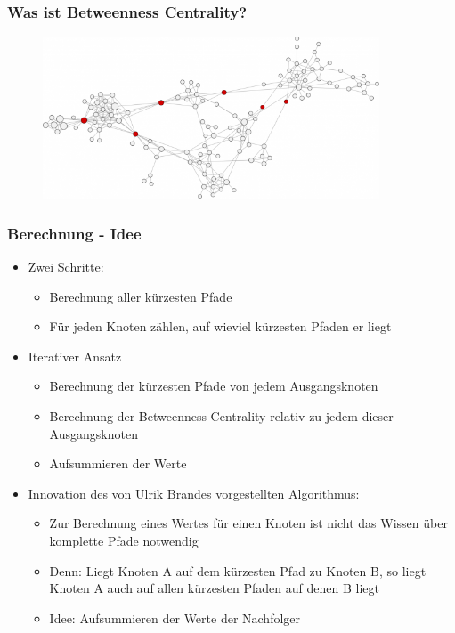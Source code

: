 \documentclass{beamer}
\begin{document}
\begin{frame}
\frametitle{Was ist Betweenness Centrality?}
\begin{figure}[h]
	\centering
	\includegraphics[width=10cm]{images/bc-example}
\end{figure}
\end{frame}
\begin{frame}
\frametitle{Berechnung - Idee}
\begin {itemize}
	\item Zwei Schritte:
	 \begin{itemize}
	 	\item Berechnung aller kürzesten Pfade
	 	\item Für jeden Knoten zählen, auf wieviel kürzesten Pfaden er liegt
	 \end {itemize}
	\item Iterativer Ansatz
	\begin{itemize}
		\item Berechnung der kürzesten Pfade von jedem Ausgangsknoten
	 	\item Berechnung der Betweenness Centrality relativ zu jedem dieser Ausgangsknoten
	 	\item Aufsummieren der Werte
	\end {itemize}
	\item Innovation des von Ulrik Brandes vorgestellten Algorithmus:
	\begin{itemize}
		\item Zur Berechnung eines Wertes für einen Knoten ist nicht das Wissen über komplette Pfade notwendig
		\item Denn: Liegt Knoten A auf dem kürzesten Pfad zu Knoten B, so liegt Knoten A auch auf allen kürzesten Pfaden auf denen B liegt
		\item Idee: Aufsummieren der Werte der Nachfolger
	 \end{itemize}
\end {itemize}
\end{frame}
\end{document}
